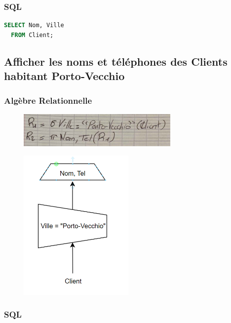 \documentclass{article}
\begin{document}
\subsubsection{SQL}

\begin{lstlisting}[language=SQL]
  SELECT Nom, Ville 
  FROM Client;
\end{lstlisting}

\subsection{Afficher les noms et téléphones des Clients habitant Porto-Vecchio}

\subsubsection{Algèbre Relationnelle}

\begin{figure}[H]
  \centering
  \includegraphics[width=0.7\textwidth]{alg/3.png}
  \label{fig:alg-rel}
\end{figure}

\begin{figure}[H]
  \centering
  \includegraphics[width=0.5\textwidth]{algRel/3.png}
  \label{fig:alg-rel}
\end{figure}


\subsubsection{SQL}
\end{document}
